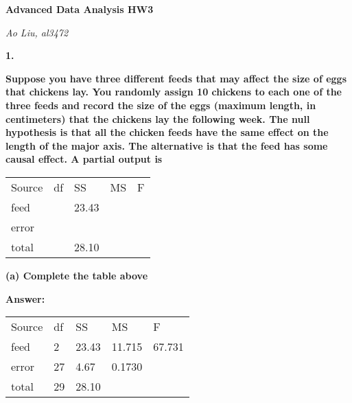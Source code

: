 \documentclass[letterpaper,11pt]{article}
\begin{document}
  \begin{center}
  	\textbf{\Huge{Advanced Data Analysis HW3}}
  \end{center}

  \begin{center}
  	\textsl{Ao Liu, al3472}
  \end{center}


  \bigbreak
  \bigbreak
  \bigbreak



\begin{addmargin}[-2em]{0em}
\large{\textbf{1. }}\end{addmargin}
\begin{addmargin}[-1.1em]{0em} \textbf{Suppose you have three different feeds that may affect the size of eggs that chickens lay. You randomly assign 10 chickens to each one of the three feeds and record the size of the eggs (maximum length, in centimeters) that the chickens lay the following week. The null hypothesis is that all the chicken feeds have the same effect on the length of the major axis. The alternative is that the feed has some causal effect. A partial output is}\par \end{addmargin}


\begin{center}
\begin{tabular}{ p{2cm}p{1cm}p{1cm}p{1cm}p{1cm}}
\centering Source & df & SS & MS & F\\
\centering feed & {} & 23.43 & {} & {}\\
\centering error & {} & {} & {} & {}\\
\centering total & {} & 28.10 & {} & {}\\
\end{tabular}
\end{center}


\begin{addmargin}[-1.1em]{0em} \textbf{(a)  Complete the table above}\par \end{addmargin}

\bigbreak
\begin{addmargin}[-0.5em]{0em}
\textbf{Answer: }\end{addmargin}

\begin{center}
\begin{tabular}{ p{2cm}p{1.5cm}p{1.5cm}p{1.5cm}p{1.5cm}}
\centering Source & df & SS & MS & F\\
\centering feed & 2 & 23.43 & 11.715 & 67.731\\
\centering error & 27 & 4.67 & 0.1730 & {}\\
\centering total & 29 & 28.10 & {} & {}\\
\end{tabular}
\end{center}
\end{document}
